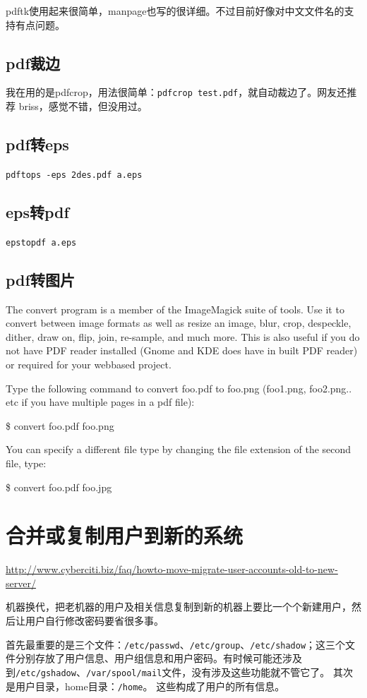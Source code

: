 {pdftk使用起来很简单，manpage也写的很详细。不过目前好像对中文文件名的支持有点问题。


\subsection{pdf裁边}
我在用的是pdfcrop，用法很简单：\verb|pdfcrop test.pdf|，就自动裁边了。网友还推荐 briss，感觉不错，但没用过。


\subsection{pdf转eps}
\verb|pdftops -eps 2des.pdf a.eps|


\subsection{eps转pdf}
\verb|epstopdf a.eps|

\subsection{pdf转图片}
The convert program is a member of the ImageMagick suite of tools. Use it to convert between image formats as well as resize an image, blur, crop, despeckle, dither, draw on, flip, join, re-sample, and much more. This is also useful if you do not have PDF reader installed (Gnome and KDE does have in built PDF reader) or required for your webbased project.

Type the following command to convert foo.pdf to foo.png (foo1.png, foo2.png.. etc if you have multiple pages in a pdf file):

\$ convert foo.pdf foo.png

You can specify a different file type by changing the file extension of the second file, type:

\$ convert foo.pdf foo.jpg


\section{合并或复制用户到新的系统}
\url{http://www.cyberciti.biz/faq/howto-move-migrate-user-accounts-old-to-new-server/}

机器换代，把老机器的用户及相关信息复制到新的机器上要比一个个新建用户，然后让用户自行修改密码要省很多事。

首先最重要的是三个文件：\verb|/etc/passwd|、\verb|/etc/group|、\verb|/etc/shadow|；这三个文件分别存放了用户信息、用户组信息和用户密码。有时候可能还涉及到\verb|/etc/gshadow|、\verb|/var/spool/mail|文件，没有涉及这些功能就不管它了。
其次是用户目录，home目录：\verb|/home|。
这些构成了用户的所有信息。

}
